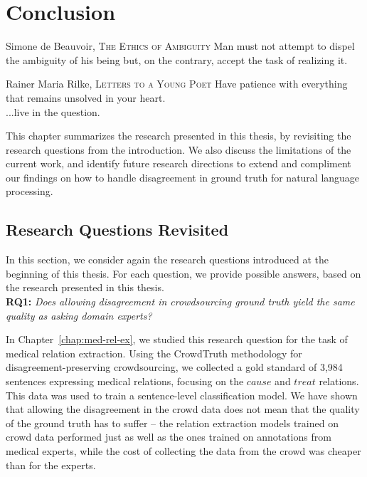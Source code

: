 %
\chapter{Conclusion}
\label{sec:conclusion}

\begin{chapquote}{Simone de Beauvoir, \textsc{The Ethics of Ambiguity}}
Man must not attempt to dispel the ambiguity of his being but, on the contrary, accept the task of realizing it.
\end{chapquote}

\begin{chapquote}{Rainer Maria Rilke, \textsc{Letters to a Young Poet}}
\noindent
Have patience with everything that remains unsolved in your heart. \\
...live in the question.
\end{chapquote}

This chapter summarizes the research presented in this thesis, by revisiting the research questions from the introduction. We also discuss the limitations of the current work, and identify future research directions to extend and compliment our findings on how to handle disagreement in ground truth for natural language processing.

\section{Research Questions Revisited}

In this section, we consider again the research questions introduced at the beginning of this thesis. For each question, we provide possible answers, based on the research presented in this thesis. \\

\textbf{RQ1:} \textit{Does allowing disagreement in crowdsourcing ground truth yield the same quality as asking domain experts?}

In Chapter~\ref{chap:med-rel-ex}, we studied this research question for the task of medical relation extraction. Using the CrowdTruth methodology for disagreement-preserving crowdsourcing, we collected a gold standard of 3,984 sentences expressing medical relations, focusing on the $cause$ and $treat$ relations. This data was used to train a sentence-level classification model. We have shown that allowing the disagreement in the crowd data does not mean that the quality of the ground truth has to suffer -- the relation extraction models trained on crowd data performed just as well as the ones trained on annotations from medical experts, while the cost of collecting the data from the crowd was cheaper than for the experts.

